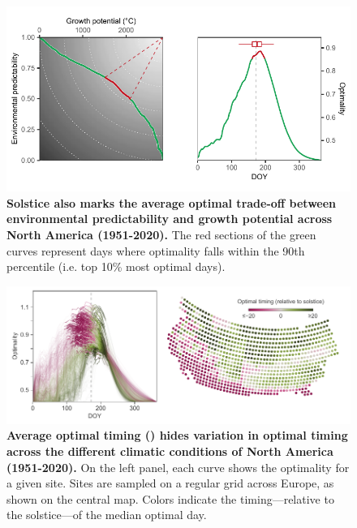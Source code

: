 \documentclass[11pt,letter]{article}
\begin{document}
\begin{figure}[h]
	\centering
	\includegraphics[scale = 1]{global_optimality_northamerica.pdf}
	\vspace*{-0.2cm}
	\caption{\textbf{Solstice also marks the average optimal trade-off between environmental predictability and growth potential across North America (1951-2020).} The red sections of the green curves represent days where optimality falls within the 90th percentile (i.e. top 10\% most optimal days).}
	\label{fig:global_norame}
	\vspace*{-10cm}
\end{figure}


\begin{figure}[h]
	\centering
	\includegraphics[scale = 1]{local_optimality_norame.pdf}
	\vspace*{-0.2cm}
	\caption{\textbf{Average optimal timing () hides variation in optimal timing across the different climatic conditions of North America (1951-2020).} On the left panel, each curve shows the optimality for a given site. Sites are sampled on a regular grid across Europe, as shown on the central map. Colors indicate the timing---relative to the solstice---of the median optimal day.}
	\label{fig:holocene}
\end{figure}
\end{document}
